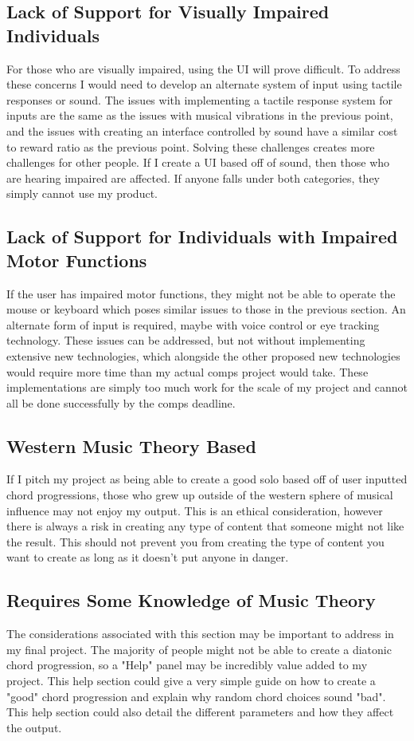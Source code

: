 \documentclass[10pt,twocolumn]{article}
\begin{document}
    \subsection{Lack of Support for Visually Impaired Individuals}
        For those who are visually impaired, using the UI will prove difficult. To address these concerns I would need to develop an alternate system of input using tactile responses or sound. The issues with implementing a tactile response system for inputs are the same as the issues with musical vibrations in the previous point, and the issues with creating an interface controlled by sound have a similar cost to reward ratio as the previous point. Solving these challenges creates more challenges for other people. If I create a UI based off of sound, then those who are hearing impaired are affected. If anyone falls under both categories, they simply cannot use my product.
        
    \subsection{Lack of Support for Individuals with Impaired Motor Functions}
        If the user has impaired motor functions, they might not be able to operate the mouse or keyboard which poses similar issues to those in the previous section. An alternate form of input is required, maybe with voice control or eye tracking technology. These issues can be addressed, but not without implementing extensive new technologies, which alongside the other proposed new technologies would require more time than my actual comps project would take. These implementations are simply too much work for the scale of my project and cannot all be done successfully by the comps deadline.
        
    \subsection{Western Music Theory Based}
        If I pitch my project as being able to create a good solo based off of user inputted chord progressions, those who grew up outside of the western sphere of musical influence may not enjoy my output. This is an ethical consideration, however there is always a risk in creating any type of content that someone might not like the result. This should not prevent you from creating the type of content you want to create as long as it doesn't put anyone in danger.
        
    \subsection{Requires Some Knowledge of Music Theory}
        The considerations associated with this section may be important to address in my final project. The majority of people might not be able to create a diatonic chord progression, so a "Help" panel may be incredibly value added to my project. This help section could give a very simple guide on how to create a "good" chord progression and explain why random chord choices sound "bad". This help section could also detail the different parameters and how they affect the output.
        
\end{document}
